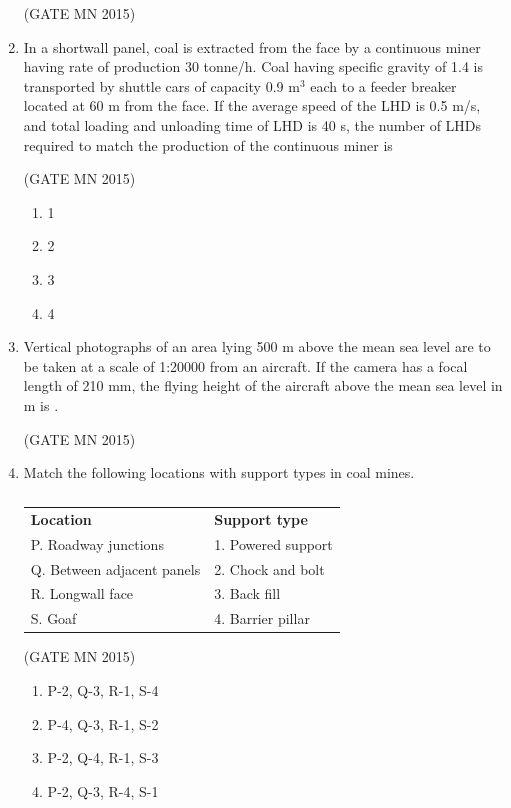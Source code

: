 \documentclass[journal]{IEEEtran}
\begin{document}
\begin{enumerate}
	\hfill(GATE MN 2015)

\item In a shortwall panel, coal is extracted from the face by a continuous miner having rate of production 30 tonne/h. Coal having specific gravity of 1.4 is transported by shuttle cars of capacity 0.9 m$^3$ each to a feeder breaker located at 60 m from the face. If the average speed of the LHD is 0.5 m/s, and total loading and unloading time of LHD is 40 s, the number of LHDs required to match the production of the continuous miner is  

	\hfill(GATE MN 2015)
\begin{multicols}{4}
\begin{enumerate}
\item 1  
\item 2  
\item 3  
\item 4  
\end{enumerate}
\end{multicols}

\item Vertical photographs of an area lying 500 m above the mean sea level are to be taken at a scale of 1:20000 from an aircraft. If the camera has a focal length of 210 mm, the flying height of the aircraft above the mean sea level in m is \underline{\hspace{2cm}}.  

	\hfill(GATE MN 2015)


\item Match the following locations with support types in coal mines.  

\begin{table}[H]                                 
\centering\normalsize
\begin{tabular}{ll}
\textbf{Location} & \textbf{ Support type}\\
P. Roadway junctions & 1. Powered support \\
Q. Between adjacent panels & 2. Chock and bolt \\
R. Longwall face & 3. Back fill \\
S. Goaf & 4. Barrier pillar \\
\end{tabular}
\caption{}
    \label{tab:Q40}
\end{table}

\hfill(GATE MN 2015)

\begin{multicols}{2}
\begin{enumerate}
\item P-2, Q-3, R-1, S-4  
\item P-4, Q-3, R-1, S-2  
\item P-2, Q-4, R-1, S-3  
\item P-2, Q-3, R-4, S-1  
\end{enumerate}
\end{multicols}


\end{enumerate}
\end{document}
